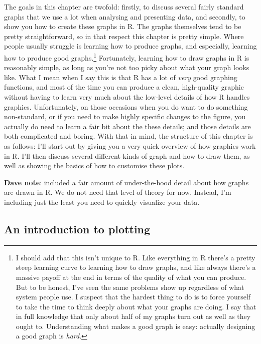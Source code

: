\documentclass[
]{book}
\begin{document}
The goals in this chapter are twofold: firstly, to discuss several fairly standard graphs that we use a lot when analysing and presenting data, and secondly, to show you how to create these graphs in R. The graphs themselves tend to be pretty straightforward, so in that respect this chapter is pretty simple. Where people usually struggle is learning how to produce graphs, and especially, learning how to produce good graphs.\footnote{I should add that this isn't unique to R. Like everything in R there's a pretty steep learning curve to learning how to draw graphs, and like always there's a massive payoff at the end in terms of the quality of what you can produce. But to be honest, I've seen the same problems show up regardless of what system people use. I suspect that the hardest thing to do is to force yourself to take the time to think deeply about what your graphs are doing. I say that in full knowledge that only about half of my graphs turn out as well as they ought to. Understanding what makes a good graph is easy: actually designing a good graph is \emph{hard}.} Fortunately, learning how to draw graphs in R is reasonably simple, as long as you're not too picky about what your graph looks like. What I mean when I say this is that R has a lot of \emph{very} good graphing functions, and most of the time you can produce a clean, high-quality graphic without having to learn very much about the low-level details of how R handles graphics. Unfortunately, on those occasions when you do want to do something non-standard, or if you need to make highly specific changes to the figure, you actually do need to learn a fair bit about the these details; and those details are both complicated and boring. With that in mind, the structure of this chapter is as follows: I'll start out by giving you a very quick overview of how graphics work in R. I'll then discuss several different kinds of graph and how to draw them, as well as showing the basics of how to customise these plots.

\textbf{Dave note}: \citet{Navarro2018} included a fair amount of under-the-hood detail about how graphs are drawn in R. We do not need that level of theory for now. Instead, I'm including just the least you need to quickly visualize your data.

\hypertarget{introplotting}{%
\subsection{An introduction to plotting}\label{introplotting}}
\end{document}
